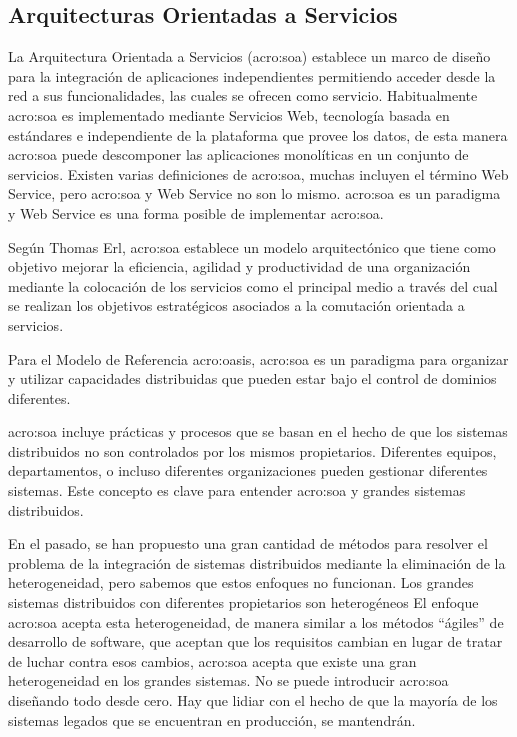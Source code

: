 \subsection{Arquitecturas Orientadas a Servicios}
\label{soa}

La Arquitectura Orientada a Servicios (\gls{acro:soa}) establece un marco de diseño para la integración de aplicaciones independientes permitiendo acceder desde la red a sus funcionalidades, las cuales se ofrecen como servicio.  Habitualmente \gls{acro:soa} es implementado mediante Servicios Web, tecnología basada en estándares e independiente de la plataforma que provee los datos, de esta manera \gls{acro:soa} puede descomponer las aplicaciones monolíticas en un conjunto de servicios.  Existen varias definiciones de \gls{acro:soa}, muchas incluyen el término Web Service, pero \gls{acro:soa} y Web Service no son lo mismo.  \gls{acro:soa} es un paradigma y Web Service es una forma posible de implementar \gls{acro:soa}.

Según Thomas Erl, \gls{acro:soa} establece un modelo arquitectónico que tiene como objetivo mejorar la eficiencia, agilidad y productividad de una organización mediante la colocación de los servicios como el principal medio a través del cual se realizan los objetivos estratégicos asociados a la comutación orientada a servicios.

Para el Modelo de Referencia \gls{acro:oasis}, \gls{acro:soa} es un paradigma para organizar y utilizar capacidades distribuidas que pueden estar bajo el control de dominios diferentes.

\gls{acro:soa} incluye prácticas y procesos que se basan en el hecho de que los sistemas distribuidos no son controlados por los mismos propietarios. Diferentes equipos, departamentos, o incluso diferentes organizaciones pueden gestionar diferentes sistemas. Este concepto es clave para entender \gls{acro:soa} y grandes sistemas distribuidos.

En el pasado, se han propuesto una gran cantidad de métodos para resolver el problema de la integración de sistemas distribuidos mediante la eliminación de la heterogeneidad, pero sabemos que estos enfoques no funcionan. Los grandes sistemas distribuidos con diferentes propietarios son heterogéneos  El enfoque \gls{acro:soa} acepta esta heterogeneidad, de manera similar a los métodos ``ágiles'' de desarrollo de software, que aceptan que los requisitos cambian en lugar de tratar de luchar contra esos cambios, \gls{acro:soa} acepta que existe una gran heterogeneidad en los grandes sistemas. No se puede introducir \gls{acro:soa} diseñando todo desde cero. Hay que lidiar con el hecho de que la mayoría de los sistemas legados que se encuentran en producción, se mantendrán.
